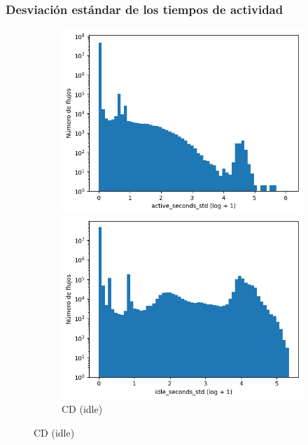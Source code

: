 \subsubsection{Desviación estándar de los tiempos de actividad}

\begin{figure}[H]
    \centering
    \begin{subfigure}[b]{0.26\textwidth}
        \centering
        \includegraphics[width=\textwidth]{media/packet_pincer_cicddos/active_seconds_std_log_x_log_y.png}
        \caption{CD (active)}
        \includegraphics[width=\textwidth]{media/packet_pincer_cicddos/idle_seconds_std_log_x_log_y.png}
        \caption{CD (idle)}
    \end{subfigure}

\end{figure}
